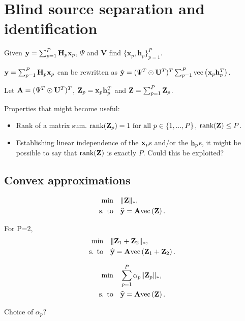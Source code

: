 \documentclass{article}
\def\Z{{\mathbf Z}}
\def\A{{\mathbf A}}
\def\U{{\mathbf U}}
\def\V{{\mathbf V}}
\def\x{{\mathbf x}}
\def\y{{\mathbf y}}
\def\h{{\mathbf h}}
\begin{document}
\section*{Blind source separation and identification}

Given $\y = \sum_{p=1}^{P} \bbH_p \x_p$, $\Psi$ and $\V$ find $\{\x_p,\h_p\}_{p=1}^{P}$.

\vspace{5mm}
\noindent
$\y = \sum_{p=1}^{P} \bbH_p \x_p$ can be rewritten as $\hat{\y} = (\Psi^T \odot \U^T)^T \sum_{p=1}^{P} \text{vec}\left(\bbx_p \bbh_p^T\right)$.

\vspace{5mm}
\noindent
Let $\bbA = (\Psi^T \odot \U^T)^T$, ${\mathbf Z}_p = {\mathbf x}_p {\mathbf h}_p^T$ and ${\mathbf Z} = \sum_{p=1}^P {\mathbf Z}_p$.


\vspace{5mm}
\noindent
Properties that might become useful:
\begin{itemize}
  \item Rank of a matrix sum. $\text{rank}({\mathbf Z}_p)=1 \ \text{\normalfont for all} \ p \in \{1,...,P\}$, $\text{rank}({\mathbf Z}) \leq P$.
  \item Establishing linear independence of the ${\mathbf x}_p$s and/or the ${\mathbf h}_p$s, it might be possible to say that $\text{rank}({\mathbf Z})$ is exactly $P$. Could this be exploited?
\end{itemize}

\subsection*{Convex approximations}

\begin{align}
\label{eq:bss_convex_minimization1}
  \text{min} \quad &\|\Z\|_{*}, \\
  \text{s. to} \quad & \widehat{\y} = \bbA \text{vec}\left(\Z\right). \nonumber
\end{align}

For P=2,
\begin{align}
\label{eq:bss_convex_minimization1_P2}
  \text{min} \quad &\|\Z_1+\Z_2\|_{*}, \\
  \text{s. to} \quad & \widehat{\y} = \bbA \text{vec}\left(\Z_1+\Z_2\right). \nonumber
\end{align}

\begin{align}
\label{eq:bss_convex_minimization2}
  \text{min} \quad &\sum_{p=1}^P \alpha_p \|\Z_p\|_{*}, \\
  \text{s. to} \quad & \widehat{\y} = \bbA \text{vec}\left(\Z\right). \nonumber
\end{align}

\noindent
Choice of $\alpha_p$?
\end{document}
